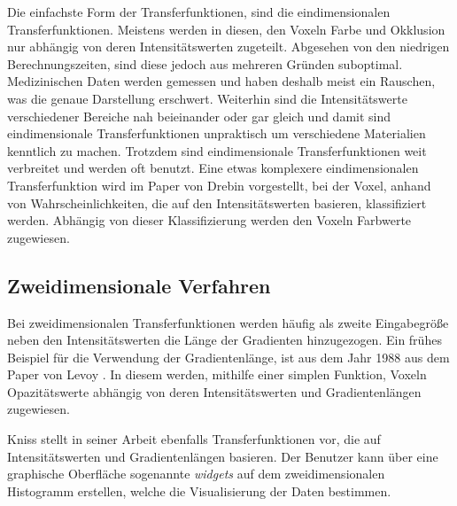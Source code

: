 Die einfachste Form der Transferfunktionen, sind die eindimensionalen Transferfunktionen. Meistens werden in diesen, den Voxeln Farbe und Okklusion nur abhängig von deren Intensitätswerten zugeteilt.
\newline
Abgesehen von den niedrigen Berechnungszeiten, sind diese jedoch aus mehreren Gründen suboptimal. Medizinischen Daten werden gemessen und haben deshalb meist ein Rauschen, was die genaue Darstellung erschwert. Weiterhin sind die Intensitätswerte verschiedener Bereiche nah beieinander oder gar gleich und damit sind eindimensionale Transferfunktionen unpraktisch um verschiedene Materialien kenntlich zu machen. Trotzdem sind eindimensionale Transferfunktionen weit verbreitet und werden oft benutzt. 
\newline
Eine etwas komplexere eindimensionalen Transferfunktion wird im Paper von Drebin \cite{drebin1988volume} vorgestellt, bei der Voxel, anhand von Wahrscheinlichkeiten, die auf den Intensitätswerten basieren, klassifiziert werden. Abhängig von dieser Klassifizierung werden den Voxeln Farbwerte zugewiesen.




\subsection{Zweidimensionale Verfahren}

Bei zweidimensionalen Transferfunktionen werden häufig als zweite Eingabegröße neben den Intensitätswerten die Länge der Gradienten hinzugezogen.
\newline
Ein frühes Beispiel für die Verwendung der Gradientenlänge, ist aus dem Jahr 1988 aus dem Paper von Levoy \cite{levoy1988display}. In diesem werden, mithilfe einer simplen Funktion, Voxeln Opazitätswerte abhängig von deren Intensitätswerten und Gradientenlängen zugewiesen.

Kniss stellt in seiner Arbeit \cite{kniss2002multidimensional} ebenfalls Transferfunktionen vor, die auf Intensitätswerten und Gradientenlängen basieren. Der Benutzer kann über eine graphische Oberfläche sogenannte \textit{widgets} auf dem zweidimensionalen Histogramm erstellen, welche die Visualisierung der Daten bestimmen.

